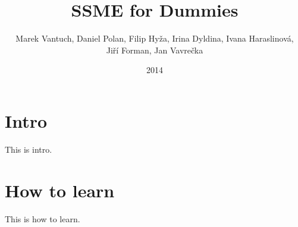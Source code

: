 \documentclass[a4paper]{article}
\begin{document}
\title{SSME for Dummies}
\author{Marek Vantuch, Daniel Polan, Filip Hyža, Irina Dyldina, Ivana Haraslinová, \\Jiří Forman, Jan Vavrečka}
\date{2014}
\maketitle
\clearpage

\tableofcontents
\clearpage

\section*{Intro}
This is intro.

\section*{How to learn}
This is how to learn.


















\end{document}
